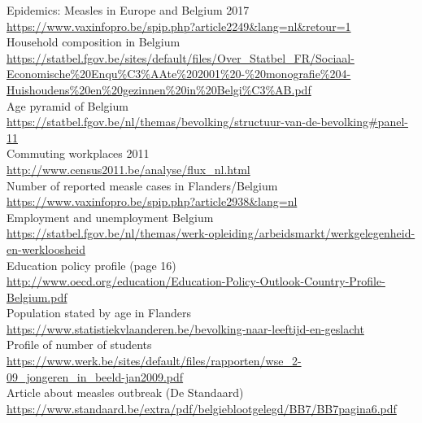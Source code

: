 \documentclass[runningheads]{llncs}
\begin{document}
\begin{thebibliography}{20}
		Epidemics: Measles in Europe and Belgium 2017 \\
		\url{https://www.vaxinfopro.be/spip.php?article2249\&lang=nl\&retour=1}
		\\
		
		Household composition in Belgium \\
		\url{https://statbel.fgov.be/sites/default/files/Over\_Statbel\_FR/Sociaal-Economische\%20Enqu\%C3\%AAte\%202001\%20-\%20monografie\%204-Huishoudens\%20en\%20gezinnen\%20in\%20Belgi\%C3\%AB.pdf}	
		\\
		
		Age pyramid of Belgium \\
		\url{https://statbel.fgov.be/nl/themas/bevolking/structuur-van-de-bevolking\#panel-11}
		\\
		
		Commuting workplaces 2011 \\
		\url{http://www.census2011.be/analyse/flux\_nl.html}
		\\
		
		Number of reported measle cases in Flanders/Belgium \\
		\url{https://www.vaxinfopro.be/spip.php?article2938\&lang=nl}
		\\
		
		Employment and unemployment Belgium \\
		\url{https://statbel.fgov.be/nl/themas/werk-opleiding/arbeidsmarkt/werkgelegenheid-en-werkloosheid}
		\\
		
		Education policy profile (page 16) \\
		\url{http://www.oecd.org/education/Education-Policy-Outlook-Country-Profile-Belgium.pdf}
		\\
		
		Population stated by age in Flanders \\
		\url{https://www.statistiekvlaanderen.be/bevolking-naar-leeftijd-en-geslacht}
		\\
		
		Profile of number of students \\
		\url{https://www.werk.be/sites/default/files/rapporten/wse\_2-09\_jongeren\_in\_beeld-jan2009.pdf}
		\\
		
		Article about measles outbreak (De Standaard) \\
		\url{https://www.standaard.be/extra/pdf/belgieblootgelegd/BB7/BB7pagina6.pdf}
		\\
		

\end{thebibliography}
\end{document}
